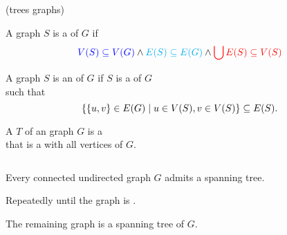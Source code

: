
\begin{frame}{}

  \begin{center}
     (trees  graphs)
  \end{center}
\end{frame}

\begin{frame}{}
  \begin{definition}[Subgraph (子图)]
    A graph $S$ is a  of $G$ if
    \[
      \textcolor{blue}{V(S) \subseteq V(G)} \land \textcolor{cyan}{E(S) \subseteq E(G)}
      \land \textcolor{red}{\bigcup E(S) \subseteq V(S)}
    \]
  \end{definition}

  \pause

  \pause
  \vspace{-0.30cm}
  \begin{definition}
    A graph $S$ is an  of $G$ if
    $S$ is a  of $G$ \\ such that
    \[
      \{\{u, v\} \in E(G) \mid u \in V(S), v \in V(S)\} \subseteq E(S).
    \]
  \end{definition}
\end{frame}

\begin{frame}{}
  \begin{definition}
    A  $T$ of an  graph $G$ is a  \\
    that is a  with all vertices of $G$.
  \end{definition}

  \pause
  \vspace{0.50cm}
  \begin{columns}
      \pause
  \end{columns}
\end{frame}

\begin{frame}{}
  \begin{theorem}
    Every connected undirected graph $G$ admits a spanning tree.
  \end{theorem}

  \pause
  \vspace{0.50cm}
  \begin{center}
    Repeatedly  until the graph is .

    \pause
    \vspace{0.30cm}
    The remaining graph is a spanning tree of $G$.
  \end{center}
\end{frame}

